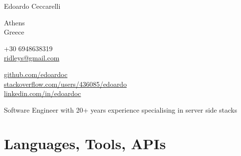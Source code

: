 \documentclass[10pt, a4paper]{article}
\newcommand\pageonefont{\sffamily}
\newcommand\pagetwofont{\rmfamily}
\begin{document}
\pageonefont

{\LARGE Edoardo Ceccarelli}\\[.2cm]

\begin{multicols}{2}

Athens\\
Greece\\

\vspace{-10pt}

+30 6948638319\\
\href{mailto:ridleys@gmail.com}{ridleys@gmail.com}\\


\columnbreak

\href{http://github.com/edoardoc}{github.com/edoardoc}\\
\href{http://stackoverflow.com/users/436085/edoardo}{stackoverflow.com/users/436085/edoardo}\\
\href{http://linkedin.com/in/edoardoc}{linkedin.com/in/edoardoc}\\
\end{multicols}

\vspace{30pt}

Software Engineer with 20+ years experience specialising in server side
stacks

\section*{Languages, Tools, APIs}
%


\pagetwofont
\newpage

\vspace{25pt}
\end{document}
